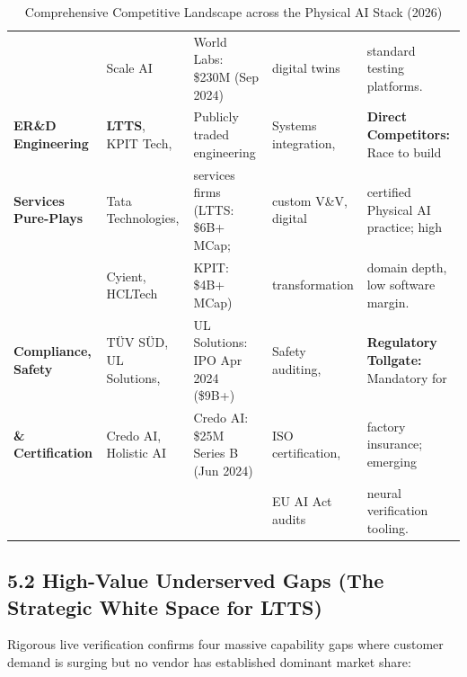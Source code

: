 \documentclass[11pt,a4paper]{article}
\begin{document}
\begin{table}[h!]
\begin{tabularx}{\textwidth}{@{}l p{3.2cm} p{3.2cm} p{2.8cm} X@{}}
& Scale AI & World Labs: \$230M (Sep 2024) & digital twins & standard testing platforms. \\
\addlinespace
\textbf{ER\&D Engineering} & \textbf{LTTS}, KPIT Tech, & Publicly traded engineering & Systems integration, & \textbf{Direct Competitors:} Race to build \\
\textbf{Services Pure-Plays} & Tata Technologies, & services firms (LTTS: \$6B+ MCap; & custom V\&V, digital & certified Physical AI practice; high \\
& Cyient, HCLTech & KPIT: \$4B+ MCap) & transformation & domain depth, low software margin. \\
\addlinespace
\textbf{Compliance, Safety} & TÜV SÜD, UL Solutions, & UL Solutions: IPO Apr 2024 (\$9B+)\newline & Safety auditing, & \textbf{Regulatory Tollgate:} Mandatory for \\
\textbf{\& Certification} & Credo AI, Holistic AI & Credo AI: \$25M Series B (Jun 2024) & ISO certification, & factory insurance; emerging \\
& & & EU AI Act audits & neural verification tooling. \\
\bottomrule
\end{tabularx}
\caption{Comprehensive Competitive Landscape across the Physical AI Stack (2026)}
\end{table}

\subsection{5.2 High-Value Underserved Gaps (The Strategic White Space for LTTS)}
Rigorous live verification confirms four massive capability gaps where customer demand is surging but no vendor has established dominant market share:
\end{document}
